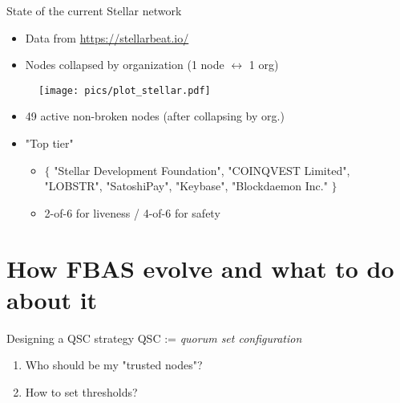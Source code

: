 \documentclass{beamer}
\newcommand{\darrow}{$\leftrightarrow$ }
\begin{document}
\begin{frame}{State of the current Stellar network}
  \begin{itemize}
    \item Data from \url{https://stellarbeat.io/}
    \item Nodes collapsed by organization (1 node \darrow 1 org)
  \end{itemize}
  \begin{figure}[htpb]
    \centering
    \texttt{[image: pics/plot\_stellar.pdf]}
  \end{figure}
  \begin{itemize}
    \item 49 active non-broken nodes (after collapsing by org.)
    \item "Top tier" \begin{itemize}
      \item $\{$ "Stellar Development Foundation", "COINQVEST Limited", "LOBSTR", "SatoshiPay", "Keybase", "Blockdaemon Inc." $\}$
      \item 2-of-6 for liveness / 4-of-6 for safety
    \end{itemize}
  \end{itemize}
\end{frame}

\section{How FBAS evolve and what to do about it}

\begin{frame}{Designing a QSC strategy}
  QSC := \emph{quorum set configuration}
  \vfill
  \begin{enumerate}
    \item \alert{Who should be my "trusted nodes"?}
    \item \alert{How to set thresholds?}%
  \end{enumerate}
\end{frame}
\end{document}
